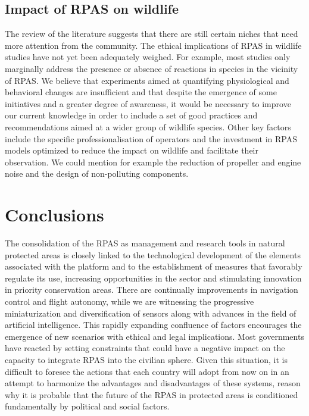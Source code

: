 \documentclass[]{interact}
\theoremstyle{plain}%
\theoremstyle{definition}
\theoremstyle{remark}
\begin{document}
\subsection{Impact of RPAS on
wildlife}\label{impact-of-rpas-on-wildlife-1}

The review of the literature suggests that there are still certain
niches that need more attention from the community. The ethical
implications of RPAS in wildlife studies have not yet been adequately
weighed. For example, most studies only marginally address the presence
or absence of reactions in species in the vicinity of RPAS. We believe
that experiments aimed at quantifying physiological and behavioral
changes are insufficient and that despite the emergence of some
initiatives and a greater degree of awareness, it would be necessary to
improve our current knowledge in order to include a set of good
practices and recommendations aimed at a wider group of wildlife
species. Other key factors include the specific professionalisation of
operators and the investment in RPAS models optimized to reduce the
impact on wildlife and facilitate their observation. We could mention
for example the reduction of propeller and engine noise and the design
of non-polluting components.

\section{Conclusions}\label{conclusions}

The consolidation of the RPAS as management and research tools in
natural protected areas is closely linked to the technological
development of the elements associated with the platform and to the
establishment of measures that favorably regulate its use, increasing
opportunities in the sector and stimulating innovation in priority
conservation areas. There are continually improvements in navigation
control and flight autonomy, while we are witnessing the progressive
miniaturization and diversification of sensors along with advances in
the field of artificial intelligence. This rapidly expanding confluence
of factors encourages the emergence of new scenarios with ethical and
legal implications. Most governments have reacted by setting constraints
that could have a negative impact on the capacity to integrate RPAS into
the civilian sphere. Given this situation, it is difficult to foresee
the actions that each country will adopt from now on in an attempt to
harmonize the advantages and disadvantages of these systems, reason why
it is probable that the future of the RPAS in protected areas is
conditioned fundamentally by political and social factors.
\end{document}
